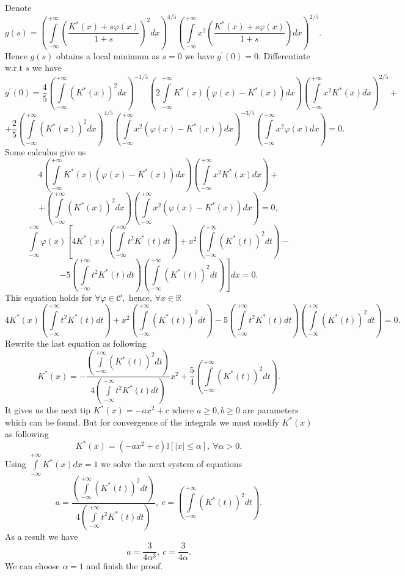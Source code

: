 \documentclass[a4paper, 12pt]{article}
\begin{document}
Denote
$$
g(s) = \left( \int \limits_{- \infty}^{+\infty} \left( \dfrac{K^*(x) + s \varphi(x)}{1 + s} \right)^2 dx \right)^{4/5} \left( \int \limits_{- \infty}^{+\infty} x^2 \left( \dfrac{K^*(x) + s \varphi(x)}{1 + s} \right) dx \right)^{2/5}.
$$ 
Hence $g(s)$ obtains a local minimum as $s = 0$ we have $g^{\prime}(0) = 0.$ 
Differentiate w.r.t $s$ we have
$$
g^{\prime}(0) = \dfrac{4}{5} \left( \int \limits_{- \infty}^{+\infty} (K^*(x))^2 dx \right)^{-1/5} 
\left( 2 \int \limits_{- \infty}^{+\infty} K^*(x) (\varphi(x) - K^*(x)) dx \right)
\left( \int \limits_{- \infty}^{+\infty} x^2 K^*(x) dx \right)^{2/5} +
$$
$$ 
+ \dfrac{2}{5} \left( \int \limits_{- \infty}^{+\infty} (K^*(x))^2 dx \right)^{4/5} 
\left( \int \limits_{- \infty}^{+\infty} x^2 (\varphi(x) - K^*(x)) dx \right)^{-3/5}
\left( \int \limits_{- \infty}^{+\infty} x^2 \varphi(x) dx \right) = 0.
$$
Some calculus give us 
$$
4 \left( \int \limits_{- \infty}^{+\infty} K^*(x) (\varphi(x) - K^*(x)) dx \right) 
\left( \int \limits_{- \infty}^{+\infty} x^2 K^*(x) dx \right) +
$$
$$ 
+ \left( \int \limits_{- \infty}^{+\infty}  (K^*(x))^2 dx \right)
\left( \int \limits_{- \infty}^{+\infty} x^2 (\varphi(x) - K^*(x)) dx \right) = 0,
$$
$$
\int \limits_{- \infty}^{+\infty} \varphi(x) \left[4 K^*(x) 
\left( \int \limits_{- \infty}^{+\infty} t^2 K^*(t) dt \right) + 
x^2 \left( \int \limits_{- \infty}^{+\infty}  (K^*(t))^2 dt \right) - \right.
$$
$$
\left. - 5 \left( \int \limits_{- \infty}^{+\infty} t^2 K^*(t) dt \right)
\left( \int \limits_{- \infty}^{+\infty}  (K^*(t))^2 dt \right)
\right] dx = 0.
$$
This equation holds for $\forall \varphi \in \mathcal{C},$ hence, $\forall x \in \mathbb{R}$
$$
4 K^*(x) 
\left( \int \limits_{- \infty}^{+\infty} t^2 K^*(t) dt \right) + 
x^2 \left( \int \limits_{- \infty}^{+\infty}  (K^*(t))^2 dt \right) - 5 \left( \int \limits_{- \infty}^{+\infty} t^2 K^*(t) dt \right)
\left( \int \limits_{- \infty}^{+\infty}  (K^*(t))^2 dt \right) = 0.
$$ 
Rewrite the last equation as following
$$
K^*(x) = - \dfrac{\left( \int \limits_{- \infty}^{+\infty}  (K^*(t))^2 dt \right)}{4\left( \int \limits_{- \infty}^{+\infty} t^2 K^*(t) dt \right)} x^2 + \dfrac{5}{4} \left( \int \limits_{- \infty}^{+\infty}  (K^*(t))^2 dt \right).
$$
It gives us the next tip $K^*(x) = -ax^2 + c$ where $a \geqslant 0, b \geqslant 0$ are parameters which can be found. 
But for convergence of the integrals we must modify $K^*(x)$ as following
$$
K^*(x) = (-ax^2 + c) \mathbb{I}[|x| \leqslant \alpha], ~ \forall \alpha > 0.
$$
Using $\int \limits_{-\infty}^{+\infty} K^*(x)dx = 1$ we solve the next system of equations
$$
a = \dfrac{\left( \int \limits_{- \infty}^{+\infty}  (K^*(t))^2 dt \right)}{4\left( \int \limits_{- \infty}^{+\infty} t^2 K^*(t) dt \right)}, ~ c = \left( \int \limits_{- \infty}^{+\infty}  (K^*(t))^2 dt \right).
$$
As a result we have
$$
a = \dfrac{3}{4 \alpha^3}, ~ c = \dfrac{3}{4\alpha}.
$$
We can choose $\alpha = 1$ and finish the proof.
\end{document}
